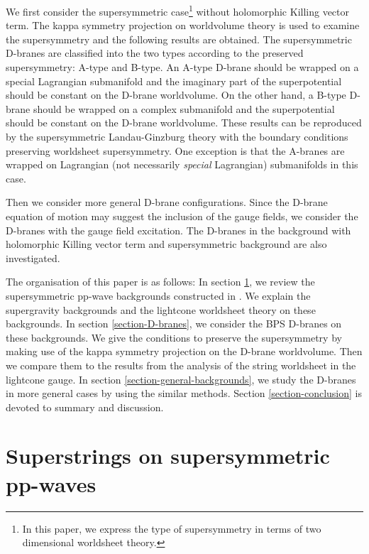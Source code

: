 \documentclass[a4paper,12pt]{article}
\numberwithin{equation}{section}
\begin{document}
We first consider the \coordHE{} supersymmetric case\footnote{
In this paper, we express the type of supersymmetry in terms of two
dimensional worldsheet theory.
} without
holomorphic Killing vector term. 
The kappa symmetry projection on worldvolume theory is used to examine
the supersymmetry and the following results are obtained.
The supersymmetric D-branes are classified into the two types according
to the preserved supersymmetry: A-type and B-type.
An A-type D-brane should be wrapped on a special Lagrangian submanifold and
the imaginary part of the superpotential should be constant on the
D-brane worldvolume. 
On the other hand, a B-type D-brane should be wrapped on a complex
submanifold and the superpotential should be constant on the D-brane
worldvolume. 
These results can be reproduced by the 
\coordHE{} supersymmetric Landau-Ginzburg theory with the 
boundary conditions preserving worldsheet supersymmetry.
One exception is that the A-branes are wrapped on Lagrangian
(not necessarily {\em special} Lagrangian) submanifolds in this case.

Then we consider more general D-brane configurations.
Since the D-brane equation of motion may suggest the inclusion of the gauge
fields, we consider the D-branes with the gauge field excitation. 
The D-branes in the background with holomorphic Killing vector term and
\coordHE{} supersymmetric background are also investigated.

The organisation of this paper is as follows: In section \ref{section-review},
we review the supersymmetric pp-wave backgrounds constructed in
\cite{Maldacena:2002fy}. We explain
the supergravity backgrounds and the lightcone worldsheet theory on these 
backgrounds. In section \ref{section-D-branes}, we consider the BPS D-branes
on these backgrounds. We give the conditions to preserve the
supersymmetry by making use of the kappa symmetry projection on the
D-brane worldvolume.
Then we compare them to the results from the
analysis of the string worldsheet in the lightcone gauge.
In section \ref{section-general-backgrounds}, we study the D-branes in
more general cases by using the similar methods.
Section \ref{section-conclusion} is devoted to summary and discussion.


\section{Superstrings on supersymmetric pp-waves}
\label{section-review}
\end{document}
